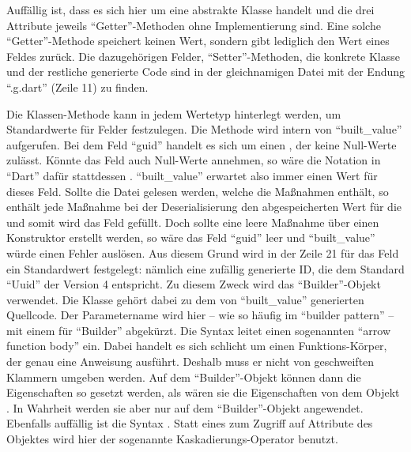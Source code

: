 Auffällig ist, dass es sich hier um eine abstrakte Klasse handelt und die drei Attribute jeweils \enquote{Getter}-Methoden ohne Implementierung sind.
Eine solche \enquote{Getter}-Methode speichert keinen Wert, sondern gibt lediglich den Wert eines Feldes zurück.
Die dazugehörigen Felder, \enquote{Setter}-Methoden, die konkrete Klasse und der restliche generierte Code sind in der gleichnamigen Datei mit der Endung \enquote{.g.dart} (Zeile 11) zu finden.

Die Klassen-Methode  kann in jedem Wertetyp hinterlegt werden, um Standardwerte für Felder festzulegen.
Die Methode wird intern von \enquote{built_value} aufgerufen.
Bei dem Feld \enquote{guid} handelt es sich um einen , der keine Null-Werte zulässt.
Könnte das Feld auch Null-Werte annehmen, so wäre die Notation in \enquote{Dart} dafür stattdessen . \enquote{built_value} erwartet also immer einen Wert für dieses Feld.
Sollte die Datei gelesen werden,
welche die Maßnahmen enthält, so enthält jede Maßnahme bei der Deserialisierung den abgespeicherten Wert für die  und somit wird das Feld gefüllt.
Doch sollte eine leere Maßnahme über einen Konstruktor erstellt werden, so wäre das Feld \enquote{guid} leer und \enquote{built_value} würde einen Fehler auslösen.
Aus diesem Grund wird in der Zeile 21 für das Feld  ein Standardwert festgelegt: nämlich eine zufällig generierte ID, die dem Standard \enquote{Uuid} der Version 4 entspricht.
Zu diesem Zweck wird das \enquote{Builder}-Objekt verwendet.
Die Klasse  gehört dabei zu dem von \enquote{built_value} generierten Quellcode.
Der Parametername wird hier -- wie so häufig im \enquote{builder pattern} -- mit einem  für \enquote{Builder} abgekürzt.
Die Syntax \IC{=>} leitet  einen sogenannten \enquote{arrow function body} ein.
Dabei handelt es sich schlicht um einen Funktions-Körper, der genau eine Anweisung ausführt. Deshalb muss er nicht von geschweiften Klammern umgeben werden.
Auf dem \enquote{Builder}-Objekt können dann die Eigenschaften so gesetzt werden, als wären sie die Eigenschaften von dem Objekt .
In Wahrheit werden sie aber nur auf dem \enquote{Builder}-Objekt angewendet.
Ebenfalls auffällig ist die Syntax .
Statt eines  zum Zugriff auf Attribute des Objektes wird hier der sogenannte Kaskadierungs-Operator  benutzt.


